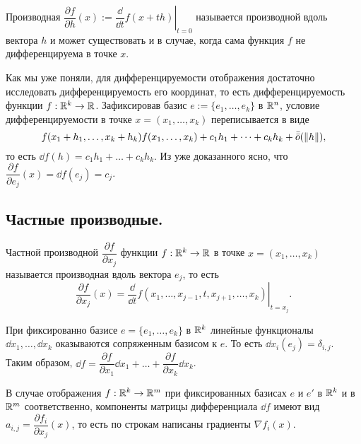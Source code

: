 \documentclass[a4paper]{article}
\theoremstyle{named}
\begin{document}
    \begin{definition*}
        Производная $\dfrac{\partial f}{\partial h}(x) := \left.\dfrac{\dd}{\dd t}f(x + th)\right|_{t = 0}$ называется производной вдоль вектора $h$ и может существовать и в случае, когда сама функция $f$ не дифференцируема в точке $x$.
    \end{definition*}

    Как мы уже поняли, для дифференцируемости отображения достаточно исследовать дифференцируемость его координат, то есть дифференцируемость функции $f: \mathbb{R}^k \to \mathbb{R}$. Зафиксировав базис $e := \{e_1, \dots, e_k\}$ в $\mathbb{R}^n$, условие дифференцируемости в точке $x = (x_1, \dots, x_k)$ переписывается в виде
    \begin{equation*}
        f(x_1 + h_1, \dots, x_k + h_k) f(x_1, \dots, x_k) + c_1h_1 + \dots + c_k h_k + \bar{\bar{o}}(\left\lVert h\right\rVert),
    \end{equation*}
    то есть $\dd f(h) = c_1h_1 + \dots + c_kh_k$. Из уже доказанного ясно, что $\dfrac{\partial f}{\partial e_j}(x) = \dd f(e_j) = c_j$.

    \subsection{Частные производные.}

    \begin{definition*}
        Частной производной $\dfrac{\partial f}{\partial x_j}$ функции $f: \mathbb{R}^k \to \mathbb{R}$ в точке $x = (x_1, \dots, x_k)$ называется производная вдоль вектора $e_j$, то есть
        \begin{equation*}
            \dfrac{\partial f}{\partial x_j}(x) = \left.\dfrac{\dd}{\dd t}f(x_1, \dots, x_{j - 1}, t, x_{j + 1}, \dots, x_k)\right|_{t = x_j}.
        \end{equation*}
    \end{definition*}

    \begin{remark*}
        При фиксированно базисе $e = \{e_1, \dots, e_k\}$ в $\mathbb{R}^k$ линейные функционалы $\dd x_1, \dots, \dd x_k$ оказываются сопряженным базисом к $e$. То есть $\dd x_i(e_j) = \delta_{i, j}$. Таким образом, $\dd f = \dfrac{\partial f}{\partial x_1}\dd x_1 + \dots + \dfrac{\partial f}{\partial x_k}\dd x_k$.
    \end{remark*}

    \begin{remark*}
        В случае отображения $f: \mathbb{R}^k \to \mathbb{R}^m$ при фиксированных базисах $e$ и $e'$ в $\mathbb{R}^k$ и в $\mathbb{R}^m$ соответственно, компоненты матрицы дифференциала $\dd f$ имеют вид $a_{i, j} = \dfrac{\partial f_i}{\partial x_j}(x)$, то есть по строкам написаны градиенты $\nabla f_i(x)$.
    \end{remark*}
\end{document}
